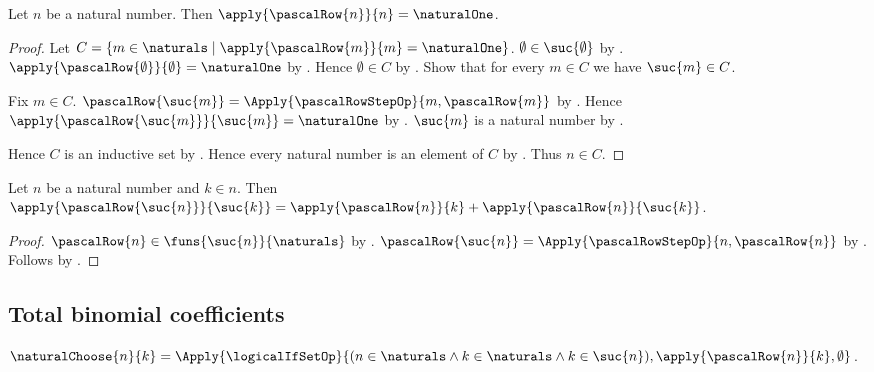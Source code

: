 \begin{proposition}\label{pascal_row_last}
    Let $n$ be a natural number.
    Then $\apply{\pascalRow{n}}{n}=\naturalOne$.
\end{proposition}
\begin{proof}
    Let $C=\{m\in\naturals\mid
        \apply{\pascalRow{m}}{m}=\naturalOne\}$.
    $\emptyset\in\suc{\emptyset}$ by .
    $\apply{\pascalRow{\emptyset}}{\emptyset}=\naturalOne$ by
        .
    Hence $\emptyset\in C$ by .
    Show that for every $m\in C$ we have $\suc{m}\in C$.
    \begin{subproof}
        Fix $m\in C$.
        $\pascalRow{\suc{m}}
            =\Apply{\pascalRowStepOp}{m,\pascalRow{m}}$ by
            .
        Hence $\apply{\pascalRow{\suc{m}}}{\suc{m}}=\naturalOne$ by
            .
        $\suc{m}$ is a natural number by .
    \end{subproof}
    Hence $C$ is an inductive set by .
    Hence every natural number is an element of $C$ by
        .
    Thus $n\in C$.
\end{proof}

\begin{proposition}\label{pascal_row_interior}
    Let $n$ be a natural number and $k\in n$.
    Then
        $\apply{\pascalRow{\suc{n}}}{\suc{k}}
            =\apply{\pascalRow{n}}{k}
                +\apply{\pascalRow{n}}{\suc{k}}$.
\end{proposition}
\begin{proof}
    $\pascalRow{n}\in\funs{\suc{n}}{\naturals}$ by
        .
    $\pascalRow{\suc{n}}
        =\Apply{\pascalRowStepOp}{n,\pascalRow{n}}$ by
        .
    Follows by .
\end{proof}

\subsection{Total binomial coefficients}

\begin{definition}\label{natural_choose}
    $\naturalChoose{n}{k}=\Apply{\logicalIfSetOp}{
        (n\in\naturals\land k\in\naturals\land k\in\suc{n}),
        \apply{\pascalRow{n}}{k},\emptyset}$.
\end{definition}

